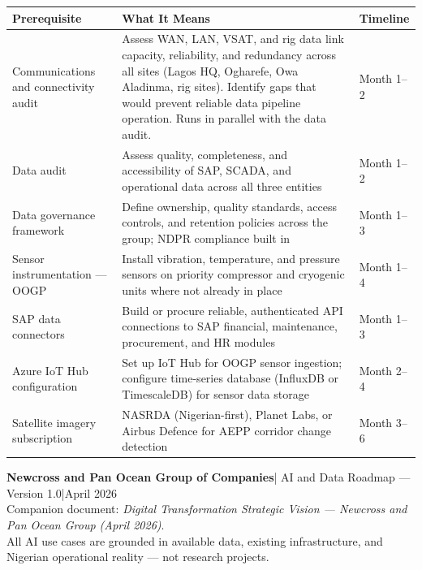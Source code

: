 \documentclass[10pt]{article}
\begin{document}
\vspace{6pt}
\small
\begin{tabularx}{\columnwidth}{@{}lXl@{}}
\toprule
\textbf{Prerequisite} & \textbf{What It Means} & \textbf{Timeline} \\
\midrule
Communications and connectivity audit
  & Assess WAN, LAN, VSAT, and rig data link capacity, reliability, and
    redundancy across all sites (Lagos HQ, Ogharefe, Owa Aladinma, rig
    sites). Identify gaps that would prevent reliable data pipeline operation.
    Runs in parallel with the data audit.
  & Month 1--2 \\[3pt]
Data audit
  & Assess quality, completeness, and accessibility of SAP, SCADA, and
    operational data across all three entities
  & Month 1--2 \\[3pt]
Data governance framework
  & Define ownership, quality standards, access controls, and retention
    policies across the group; NDPR compliance built in
  & Month 1--3 \\[3pt]
Sensor instrumentation --- OOGP
  & Install vibration, temperature, and pressure sensors on priority
    compressor and cryogenic units where not already in place
  & Month 1--4 \\[3pt]
SAP data connectors
  & Build or procure reliable, authenticated API connections to SAP
    financial, maintenance, procurement, and HR modules
  & Month 1--3 \\[3pt]
Azure IoT Hub configuration
  & Set up IoT Hub for OOGP sensor ingestion; configure time-series
    database (InfluxDB or TimescaleDB) for sensor data storage
  & Month 2--4 \\[3pt]
Satellite imagery subscription
  & NASRDA (Nigerian-first), Planet Labs, or Airbus Defence for
    AEPP corridor change detection
  & Month 3--6 \\
\bottomrule
\end{tabularx}
\normalsize

\vspace{10pt}

\vspace{6pt}
{\small\color{darkgrey}
\textbf{Newcross and Pan Ocean Group of Companies}\enspace|\enspace
AI and Data Roadmap --- Version 1.0\enspace|\enspace April 2026\\
Companion document: \textit{Digital Transformation Strategic Vision ---
Newcross and Pan Ocean Group (April 2026)}.\\
All AI use cases are grounded in available data, existing infrastructure,
and Nigerian operational reality --- not research projects.
}
\end{document}
